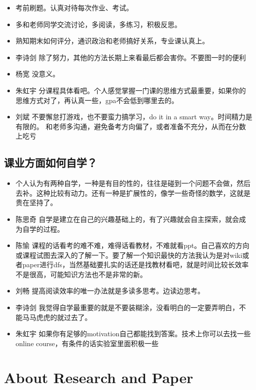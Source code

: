 \documentclass{vivid_layout}
\begin{document}
\begin{itemize}
\item 考前刷题。认真对待每次作业、考试。
\item 多和老师同学交流讨论，多阅读，多练习，积极反思。
\item 熟知期末如何评分，通识政治和老师搞好关系，专业课认真上。
\item  { 李诗剑}  \quad 除了努力，其他的方法长期上来看最后都会害你。不要图一时的便利
\item  { 杨宽}  \quad 没意义。
\item  { 朱虹宇}  \quad 分课程具体看吧。个人感觉掌握一门课的思维方式最重要，如果你的思维方式对了，再认真一些，gpa不会低到哪里去的。
\item  { 刘斌}  \quad 不要懈怠打游戏，也不要蛮力搞学习，do it in a smart way。时间精力是有限的。
    和老师多沟通，避免备考方向偏了，或者准备不充分，从而在分数上吃亏
\end{itemize}


\subsection{课业方面如何自学？}
\begin{itemize}
\item 个人认为有两种自学，一种是有目的性的，往往是碰到一个问题不会做，然后去补。这种比较有动力。还有一种是扩展性的，像学一些奇怪的数学，这就是贵在坚持了。
\item { 陈思奇} \quad 自学是建立在自己的兴趣基础上的，有了兴趣就会自主探索，就会成为自学的过程。
\item { 陈愉}  \quad  课程的话看考的难不难，难得话看教材，不难就看ppt。自己喜欢的方向或课程试图去深入的了解一下。要了解一个知识最快的方法我认为是对wiki或者paper进行dfs，当然基础要扎实的话还是找教材看吧，就是时间比较长效率不是很高，可能知识方法也不是非常的新。
\item  { 刘畅}  \quad 提高阅读效率的唯一办法就是多读多思考。边读边思考。
\item  { 李诗剑}  \quad 我觉得自学最重要的就是不要装糊涂，没看明白的一定要弄明白，不能马马虎虎的就过去了。
\item  { 朱虹宇}  \quad 如果你有足够的motivation自己都能找到答案。技术上你可以去找一些online course，有条件的话实验室里面积极一些
\end{itemize}

\section{About Research and Paper}
\addtocounter{section}{1}
\setcounter{subsection}{0}
\end{document}
